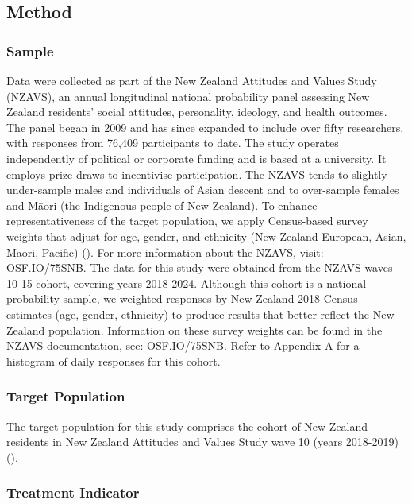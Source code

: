 \documentclass[
  single column]{article}
\begin{document}
\subsection{Method}\label{method}

\subsubsection{Sample}\label{sample}

Data were collected as part of the New Zealand Attitudes and Values
Study (NZAVS), an annual longitudinal national probability panel
assessing New Zealand residents' social attitudes, personality,
ideology, and health outcomes. The panel began in 2009 and has since
expanded to include over fifty researchers, with responses from 76,409
participants to date. The study operates independently of political or
corporate funding and is based at a university. It employs prize draws
to incentivise participation. The NZAVS tends to slightly under-sample
males and individuals of Asian descent and to over-sample females and
Māori (the Indigenous people of New Zealand). To enhance
representativeness of the target population, we apply Census-based
survey weights that adjust for age, gender, and ethnicity (New Zealand
European, Asian, Māori, Pacific) (). For more information about the NZAVS, visit:
\href{https://doi.org/10.17605/OSF.IO/75SNB}{OSF.IO/75SNB}. The data for
this study were obtained from the NZAVS waves 10-15 cohort, covering
years 2018-2024. Although this cohort is a national probability sample,
we weighted responses by New Zealand 2018 Census estimates (age, gender,
ethnicity) to produce results that better reflect the New Zealand
population. Information on these survey weights can be found in the
NZAVS documentation, see:
\href{https://doi.org/10.17605/OSF.IO/75SNB}{OSF.IO/75SNB}. Refer to
\hyperref[appendix-timeline]{Appendix A} for a histogram of daily
responses for this cohort.

\subsubsection{Target Population}\label{target-population}

The target population for this study comprises the cohort of New Zealand
residents in New Zealand Attitudes and Values Study wave 10 (years
2018-2019) ().

\subsubsection{Treatment Indicator}\label{treatment-indicator}
\end{document}
